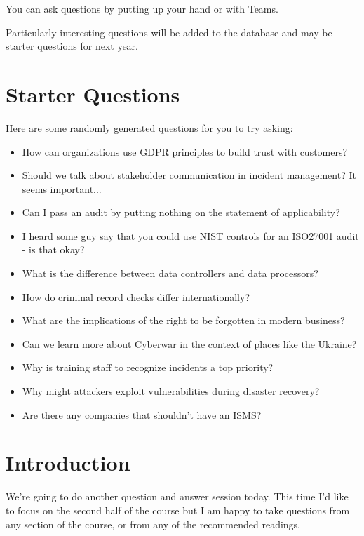 \documentclass[12pt]{article}
\begin{document}
You can ask questions by putting up your hand or with Teams.  

Particularly interesting questions will be added to the database and may be starter questions for next year.  

\section*{Starter Questions} 
Here are some randomly generated questions for you to try asking: 

\begin{itemize}
  \item How can organizations use GDPR principles to build trust with customers?
  \item Should we talk about stakeholder communication in incident management? It seems important...
  \item Can I pass an audit by putting nothing on the statement of applicability?
  \item I heard some guy say that you could use NIST controls for an ISO27001 audit - is that okay?
  \item What is the difference between data controllers and data processors?
  \item How do criminal record checks differ internationally?
  \item What are the implications of the right to be forgotten in modern business?
  \item Can we learn more about Cyberwar in the context of places like the Ukraine?
  \item Why is training staff to recognize incidents a top priority?
  \item Why might attackers exploit vulnerabilities during disaster recovery?
  \item Are there any companies that shouldn't have an ISMS?
\end{itemize}


%
%



\maketitle

\section*{Introduction}
We're going to do another question and answer session today. This time I'd like to focus on the second half of the course but I am happy to take questions from any section of the course, or from any of the recommended readings. 
\end{document}
